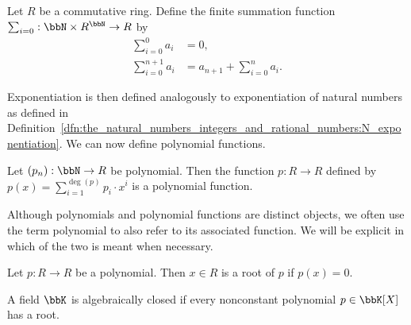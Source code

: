 \begin{definition}
    Let $R$ be a commutative ring. Define the finite summation function $\sum_{i=0}:\bbN\times R^\bbN\to R$ by
    \begin{align*}
        \sum_{i=0}^0a_i & =0, \\
        \sum_{i=0}^{n+1}a_i & =a_{n+1}+\sum_{i=0}^na_i.
    \end{align*}
\end{definition}
Exponentiation is then defined analogously to exponentiation of natural numbers as defined in Definition~\ref{dfn:the_natural_numbers_integers_and_rational_numbers:N_exponentiation}. We can now define polynomial functions.
\begin{definition}
    Let $(p_n):\bbN\to R$ be polynomial. Then the function $p:R\to R$ defined by $p(x)=\sum_{i=1}^{\deg(p)}p_i\cdot x^i$ is a polynomial function.
\end{definition}
Although polynomials and polynomial functions are distinct objects, we often use the term polynomial to also refer to its associated function. We will be explicit in which of the two is meant when necessary.
\begin{definition}
    Let $p:R\to R$ be a polynomial. Then $x\in R$ is a root of $p$ if $p(x)=0$.
\end{definition}
\begin{definition}
    A field $\bbK$ is algebraically closed if every nonconstant polynomial $p\in\bbK[X]$ has a root.
\end{definition}
